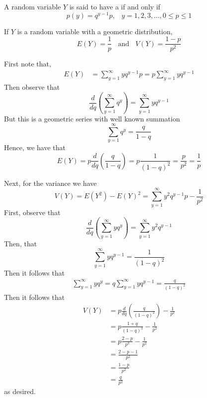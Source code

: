 \documentclass[12pt, a4paper, twoside, openright, titlepage]{book}
\begin{document}
\begin{defn}{}{}
    A random variable $Y$ is said to have a  if and only if \begin{equation*}
        p(y) = q^{y-1}p,\;\;\;y = 1,2,3,..., 0\leq p \leq 1
    \end{equation*}
\end{defn}


\begin{thm}{}{}
    If $Y$ is a random variable with a geometric distribution, \begin{equation*}
        E(Y) = \frac{1}{p}\;\;\text{ and }\;\;V(Y) = \frac{1-p}{p^2}
    \end{equation*}
\end{thm}
\begin{proof*}
    First note that,
    \begin{align*}
        E(Y) &= \sum\limits_{y=1}^{\infty}yq^{y-1}p = p\sum\limits_{y=1}^{\infty}yq^{y-1}
    \end{align*}
    Then observe that $$\frac{d}{dq} \left(\sum\limits_{y=1}^{\infty}q^y\right) = \sum\limits_{y=1}^{\infty}yq^{y-1}$$
    But this is a geometric series with well known summation \begin{equation*}
        \sum\limits_{y=1}^{\infty}q^y = \frac{q}{1-q}
    \end{equation*}
    Hence, we have that \begin{equation*}
        E(Y) = p\frac{d}{dq}\left(\frac{q}{1-q}\right) = p\frac{1}{(1-q)^2} = \frac{p}{p^2} = \frac{1}{p}
    \end{equation*}
    

    Next, for the variance we have \begin{equation*}
        V(Y) = E(Y^2)-E(Y)^2 = \sum\limits_{y=1}^{\infty}y^2q^{y-1}p - \frac{1}{p^2}
    \end{equation*}
    First, observe that $$\frac{d}{dq} \left(\sum\limits_{y=1}^{\infty}yq^y\right) = \sum\limits_{y=1}^{\infty}y^2q^{y-1}$$
    Then, that \begin{equation*}
        \sum\limits_{y=1}^{\infty}yq^{y-1} = \frac{1}{(1-q)^2}
    \end{equation*}
    Then it follows that \begin{align*}
        \sum\limits_{y=1}^{\infty}yq^y = q\sum\limits_{y=1}^{\infty}yq^{y-1} = \frac{q}{(1-q)^2}
    \end{align*}
    Then it follows that \begin{align*}
        V(Y) &= p\frac{d}{dq}\left(\frac{q}{(1-q)^2}\right) -\frac{1}{p^2} \\
        &= p\frac{1+q}{(1-q)^3} - \frac{1}{p^2} \\
        &= p\frac{2-p}{p^3} - \frac{1}{p^2} \\
        &= \frac{2-p-1}{p^2} \\
        &=\frac{1-p}{p^2} \\
        &= \frac{q}{p^2}
    \end{align*}
    as desired.
\end{proof*}
\end{document}
